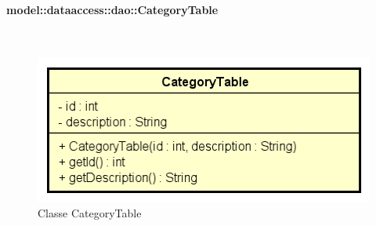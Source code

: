 \documentclass[../DefinizioneDiProdotto.tex]{subfiles}
\begin{document}
\paragraph{model::dataaccess::dao::CategoryTable}
\
\begin{figure}[H]
	\centering
	\includegraphics[width=\maxwidth]{img/CategoryTable.png}
	\caption{Classe CategoryTable}\label{fig:model::dataaccess::dao::CategoryTable} 
\end{figure}
\end{document}
